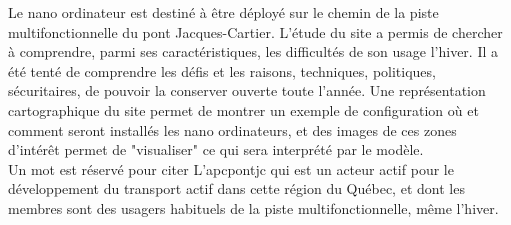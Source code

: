 ﻿\noindent Le nano ordinateur est destiné à être déployé sur le chemin de la piste multifonctionnelle du pont Jacques-Cartier. L'étude du site a permis de chercher à comprendre, parmi ses caractéristiques, les difficultés de son usage l'hiver. Il a été tenté de comprendre les défis et les raisons, techniques, politiques, sécuritaires, de pouvoir la conserver ouverte toute l'année. Une représentation cartographique du site permet de montrer un exemple de configuration où et comment seront installés les nano ordinateurs, et des images de ces  zones d'intérêt permet de "visualiser" ce qui sera interprété par le modèle. 
\vspace{\baselineskip}
\\
\noindent Un mot est réservé pour citer L'\acrlong{apcpontjc} qui est un acteur actif pour le développement du transport actif dans cette région du Québec, et dont les membres sont des usagers habituels de la piste multifonctionnelle, même l'hiver.